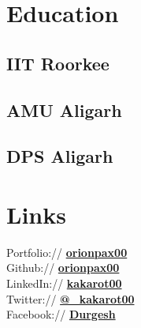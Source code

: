 \documentclass[]{durgesh_resume}
\begin{document}
%
%
\lastupdated

%
%

%
%

\begin{minipage}[t]{0.33\textwidth} 


\section{Education} 

\subsection{IIT Roorkee}
\sectionsep

\subsection{AMU Aligarh}
\sectionsep

\subsection{DPS Aligarh}
\sectionsep


\section{Links} 
Portfolio:// \href{https://orionpax00.github.io}{\bf orionpax00} \\
Github:// \href{https://github.com/orionpax00}{\bf orionpax00} \\
LinkedIn://  \href{https://www.linkedin.com/in/kakarot00}{\bf kakarot00} \\
Twitter://  \href{https://twitter.com/_kakarot00}{\bf @\_kakarot00} \\
Facebook:// \href{https://facebook.com/profile.php?id=100007483021008}{\bf Durgesh} \\


\end{minipage}
\end{document}
